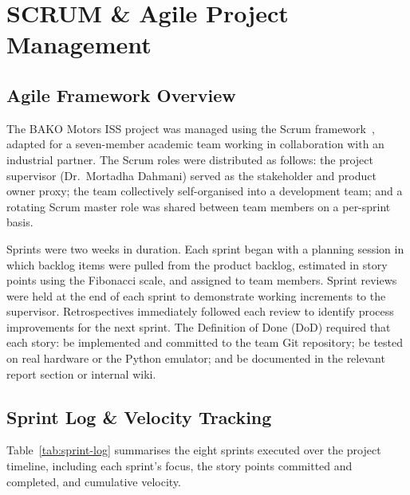 \section{SCRUM \& Agile Project Management}

\subsection{Agile Framework Overview}

The BAKO Motors ISS project was managed using the Scrum framework~\cite{scrumguide}, adapted for a seven-member academic team working in collaboration with an industrial partner. The Scrum roles were distributed as follows: the project supervisor (Dr.\ Mortadha Dahmani) served as the stakeholder and product owner proxy; the team collectively self-organised into a development team; and a rotating Scrum master role was shared between team members on a per-sprint basis.

Sprints were two weeks in duration. Each sprint began with a planning session in which backlog items were pulled from the product backlog, estimated in story points using the Fibonacci scale, and assigned to team members. Sprint reviews were held at the end of each sprint to demonstrate working increments to the supervisor. Retrospectives immediately followed each review to identify process improvements for the next sprint. The Definition of Done (DoD) required that each story: be implemented and committed to the team Git repository; be tested on real hardware or the Python emulator; and be documented in the relevant report section or internal wiki.

\subsection{Sprint Log \& Velocity Tracking}

Table~\ref{tab:sprint-log} summarises the eight sprints executed over the project timeline, including each sprint's focus, the story points committed and completed, and cumulative velocity.

